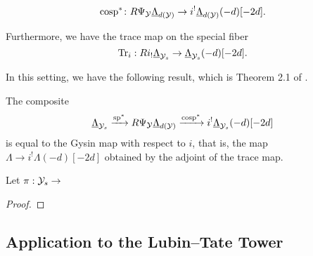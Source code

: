 \documentclass[../main.tex]{subfiles}
\begin{document}
\begin{equation*}
  \mathrm{cosp}^* \colon R\Psi_{\mathcal{Y}} \underline\Lambda_{d(\mathcal{Y})} \to i^!
  \underline\Lambda_{d(\mathcal{Y})}(-d)[-2d].
\end{equation*}

Furthermore, we have the trace map on the special fiber
\begin{equation*}
  \operatorname{Tr}_i: R i_! \underline \Lambda_{\mathcal{Y}_s} \to \underline \Lambda_{\mathcal{Y}_s}(-d)[-2d].
\end{equation*}

In this setting, we have the following result, which is Theorem 2.1 of
\cite{mieda2016geometric}.
\begin{thm}\label{thm:MiedaFirstStepSpecMap}
  The composite 
  $$\underline{\Lambda}_{\mathcal{Y}_s} \xrightarrow{\mathrm{sp}^*} R \Psi_{\mathcal{Y}} \underline \Lambda_{d(\mathcal{Y})} \xrightarrow{\mathrm{cosp}^*} i^! \underline \Lambda_{\mathcal{Y}_s}(-d)[-2d]$$
  is equal to the Gysin map with respect to $i$, that is, the map
  $\Lambda \to i^! \Lambda(-d)[-2d]$ obtained by the adjoint of the trace map.
\end{thm}



\begin{thm}\label{thm:MiedaThmFiniteLvl}
  Let $\pi: \mathcal{Y}_s \to $
\begin{proof}
\end{proof}
\end{thm}


\subsection{Application to the Lubin--Tate Tower} %
\label{sub:Application to the Lubin--Tate Tower}
\end{document}
